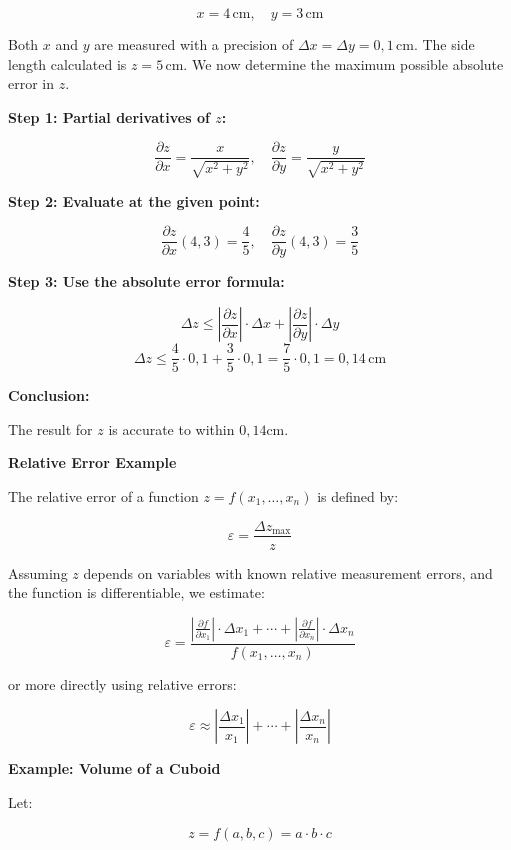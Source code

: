 \[
    x = 4 \, \text{cm}, \quad y = 3 \, \text{cm}
\]

Both \(x\) and \(y\) are measured with a precision of \( \Delta x = \Delta y = 0{,}1 \, \text{cm} \). 
The side length calculated is \( z = 5 \, \text{cm} \). We now determine the maximum possible absolute 
error in \(z\).

\textbf{Step 1: Partial derivatives of \(z\):}

\[
    \frac{\partial z}{\partial x} = \frac{x}{\sqrt{x^2 + y^2}}, \quad
    \frac{\partial z}{\partial y} = \frac{y}{\sqrt{x^2 + y^2}}
\]

\textbf{Step 2: Evaluate at the given point:}

\[
    \frac{\partial z}{\partial x}(4, 3) = \frac{4}{5}, \quad
    \frac{\partial z}{\partial y}(4, 3) = \frac{3}{5}
\]

\textbf{Step 3: Use the absolute error formula:}

\[
    \Delta z \leq \left| \frac{\partial z}{\partial x} \right| \cdot \Delta x + \left| \frac{\partial z}
    {\partial y} \right| \cdot \Delta y
\]
\[
    \Delta z \leq \frac{4}{5} \cdot 0{,}1 + \frac{3}{5} \cdot 0{,}1 = \frac{7}{5} \cdot 0{,}1 = 0{,}14 \, 
    \text{cm}
\]

\textbf{Conclusion:}  

The result for \(z\) is accurate to within \( 0,14 \text{cm} \).

\textbf{Relative Error Example}

The relative error of a function \( z = f(x_1, \dots, x_n) \) is defined by:

\[
    \varepsilon = \frac{\Delta z_{\max}}{z}
\]

Assuming \(z\) depends on variables with known relative measurement errors, and the function is 
differentiable, we estimate:

\[
    \varepsilon = \frac{\left| \frac{\partial f}{\partial x_1} \right| \cdot 
    \Delta x_1 + \cdots + \left| \frac{\partial f}{ 
    \partial x_n}\right| \cdot \Delta x_n}{f(x_1, \dots, x_n)}
\]

or more directly using relative errors:

\[
    \varepsilon \approx \left| \frac{\Delta x_1}{x_1} \right| + \cdots + \left| \frac{\Delta x_n}{x_n} 
    \right|
\]

\textbf{Example: Volume of a Cuboid}

Let:

\[
    z = f(a, b, c) = a \cdot b \cdot c
\]

